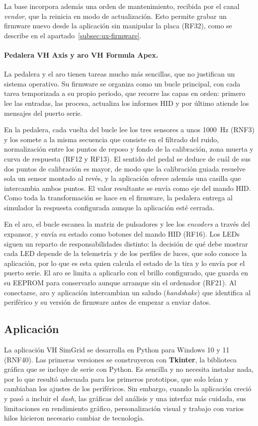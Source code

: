 La base incorpora además una orden de mantenimiento, recibida por el canal \textit{vendor}, que la reinicia en modo de actualización. Esto permite grabar un firmware nuevo desde la aplicación sin manipular la placa (RF32), como se describe en el apartado~\ref{subsec:ux-firmware}.

\paragraph{Pedalera VH Axis y aro VH Formula Apex.}
La pedalera y el aro tienen tareas mucho más sencillas, que no justifican un sistema operativo. Su firmware se organiza como un bucle principal, con cada tarea temporizada a su propio periodo, que recorre las capas en orden: primero lee las entradas, las procesa, actualiza los informes HID y por último atiende los mensajes del puerto serie.

En la pedalera, cada vuelta del bucle lee los tres sensores a unos 1000~Hz (RNF3) y los somete a la misma secuencia que consiste en el filtrado del ruido, normalización entre los puntos de reposo y fondo de la calibración, zona muerta y curva de respuesta (RF12 y RF13). El sentido del pedal se deduce de cuál de sus dos puntos de calibración es mayor, de modo que la calibración guiada resuelve sola un sensor montado al revés, y la aplicación ofrece además una casilla que intercambia ambos puntos. El valor resultante se envía como eje del mando HID. Como toda la transformación se hace en el firmware, la pedalera entrega al simulador la respuesta configurada aunque la aplicación esté cerrada.

En el aro, el bucle escanea la matriz de pulsadores y lee los \textit{encoders} a través del expansor, y envía su estado como botones del mando HID (RF16). Los LEDs siguen un reparto de responsabilidades distinto: la decisión de qué debe mostrar cada LED depende de la telemetría y de los perfiles de luces, que solo conoce la aplicación, por lo que es esta quien calcula el estado de la tira y lo envía por el puerto serie. El aro se limita a aplicarlo con el brillo configurado, que guarda en su EEPROM para conservarlo aunque arranque sin el ordenador (RF21). Al conectarse, aro y aplicación intercambian un saludo (\textit{handshake}) que identifica al periférico y su versión de firmware antes de empezar a enviar datos.

\subsection{Aplicación}
\label{subsec:arq-aplicacion}
La aplicación VH SimGrid se desarrolla en Python para Windows 10 y 11 (RNF40). Las primeras versiones se construyeron con \textbf{Tkinter}, la biblioteca gráfica que se incluye de serie con Python. Es sencilla y no necesita instalar nada, por lo que resultó adecuada para los primeros prototipos, que solo leían y cambiaban los ajustes de los periféricos. Sin embargo, cuando la aplicación creció y pasó a incluir el \textit{dash}, las gráficas del análisis y una interfaz más cuidada, sus limitaciones en rendimiento gráfico, personalización visual y trabajo con varios hilos hicieron necesario cambiar de tecnología.

